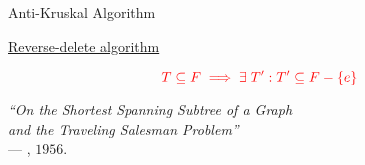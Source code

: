 \begin{frame}{}
  \begin{exampleblock}{Anti-Kruskal Algorithm}
    \centerline{\href{https://en.wikipedia.org/wiki/Reverse-delete_algorithm}{Reverse-delete algorithm }}
  \end{exampleblock}

  \pause
  \vspace{0.30cm}
  \begin{center}
    {}
  \end{center}

  \[
    \textcolor{red}{T \subseteq F \implies \exists\; T': T' \subseteq F - \{e\}}
  \]

  \pause
  \vspace{0.20cm}
  \begin{center}
    {\it ``On the Shortest Spanning Subtree of a Graph \\
    and the Traveling Salesman Problem''} \\
    \hfill --- , $1956$.
  \end{center}
\end{frame}

\begin{frame}{}
\end{frame}

\begin{frame}{}

  \begin{center}
  \end{center}
\end{frame}

\begin{frame}{}
\end{frame}


